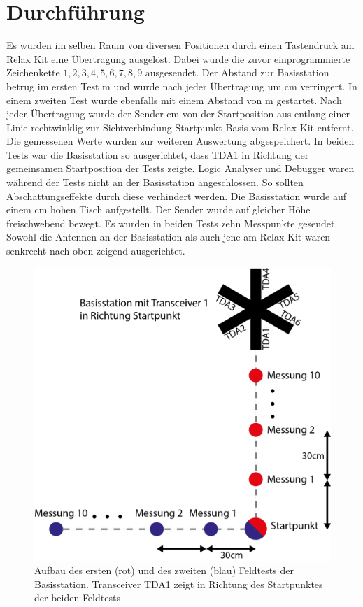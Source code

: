 \section{Durchführung}
Es wurden  im selben Raum von diversen Positionen durch einen Tastendruck am Relax Kit eine Übertragung ausgelöst. Dabei wurde die zuvor einprogrammierte Zeichenkette $1,2,3,4,5,6,7,8,9$ ausgesendet. Der Abstand zur Basisstation betrug im ersten Test  \unit[3,30]{m} und wurde nach jeder Übertragung um \unit[30]{cm} verringert. 
In einem zweiten Test wurde ebenfalls mit einem Abstand von \unit[3,30]{m} gestartet.  Nach jeder Übertragung wurde der Sender \unit[30]{cm}  von der Startposition aus entlang einer  Linie rechtwinklig zur Sichtverbindung Startpunkt-Basis vom Relax Kit entfernt. Die gemessenen Werte wurden zur weiteren Auswertung abgespeichert.
In beiden Tests war die Basisstation so ausgerichtet, dass TDA1 in Richtung der gemeinsamen Startposition der Tests zeigte. Logic Analyser und Debugger waren während der Tests nicht an der Basisstation angeschlossen. So sollten Abschattungseffekte durch diese verhindert werden. Die Basisstation wurde auf einem \unit[70]{cm} hohen Tisch aufgestellt. Der Sender wurde auf gleicher Höhe freischwebend bewegt. Es wurden in beiden Tests zehn Messpunkte gesendet. Sowohl die Antennen an der Basisstation als auch jene am Relax Kit waren senkrecht nach oben zeigend ausgerichtet.
\begin{figure}[h]
\centering
\includegraphics[width=0.7\linewidth]{"Abbildungen/Aufbau Feldtest/Aufbau Feldtest"}
\caption[Aufbau des Testszenarios]{Aufbau des ersten (rot) und des zweiten (blau) Feldtests der Basisstation. Transceiver TDA1 zeigt in Richtung des Startpunktes der beiden Feldtests}
\label{fig:aufbau-feldtest}
\end{figure}


